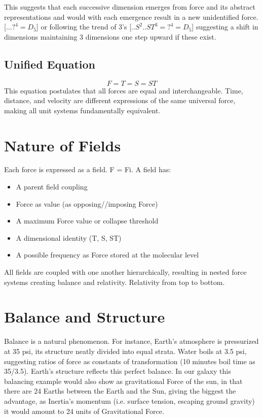 \documentclass[12pt]{article}
\begin{document}
\noindent This suggests that each successive dimension emerges from force and its abstract representations and would with each emergence result in a new unidentified force. [$...?^4 = D_5$] or following the trend of 3's [$..S^2..ST^3 = ?^4 = D_5$] suggesting a shift in dimensions maintaining 3 dimensions one step upward if these exist.

\subsection{Unified Equation}
\[
F = T = S = ST
\]
This equation postulates that all forces are equal and interchangeable. Time, distance, and velocity are different expressions of the same universal force, making all unit systems fundamentally equivalent.

\section{Nature of Fields}
Each force is expressed as a field. F = Fi. A field has:
\begin{itemize}
    \item A parent field coupling
    \item Force as value (as opposing//imposing Force)
    \item A maximum Force value or collapse threshold
    \item A dimensional identity (T, S, ST)
    \item A possible frequency as Force stored at the molecular level
\end{itemize}

All fields are coupled with one another hierarchically, resulting in nested force systems creating balance and relativity. Relativity from top to bottom.

\section{Balance and Structure}
Balance is a natural phenomenon. For instance, Earth’s atmosphere is pressurized at 35 psi, its structure neatly divided into equal strata. Water boils at 3.5 psi, suggesting ratios of force as constants of transformation (10 minutes boil time as 35/3.5). Earth’s structure reflects this perfect balance. In our galaxy this balancing example would also show as gravitational Force of the sun, in that there are 24 Earths between the Earth and the Sun, giving the biggest the advantage, as Inertia's momentum (i.e. surface tension, escaping ground gravity) it would amount to 24 units of Gravitational Force. 
\end{document}
